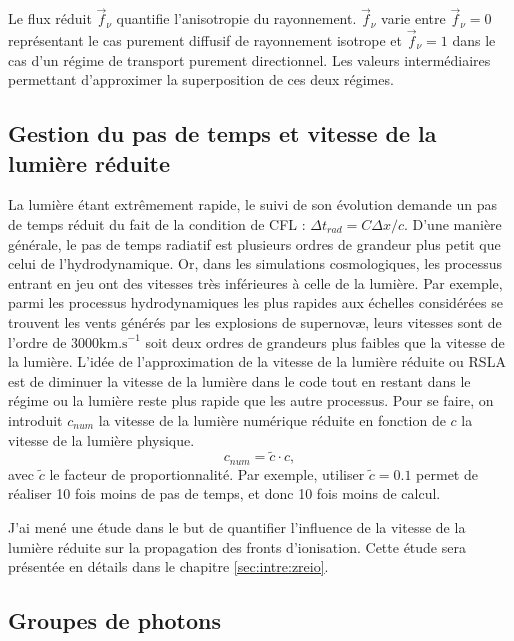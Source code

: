 Le flux réduit $\vec{f}_\nu$ quantifie l'anisotropie du rayonnement.
$\vec{f}_\nu$ varie entre $\vec{f}_\nu=0$ représentant le cas purement diffusif de rayonnement isotrope et $\vec{f}_\nu=1$ dans le cas d'un régime de transport purement directionnel.
Les valeurs intermédiaires permettant d'approximer la superposition de ces deux régimes.

\subsection{Gestion du pas de temps et vitesse de la lumière réduite}
\label{sec:RSLA}

La lumière étant extrêmement rapide, le suivi de son évolution demande un pas de temps réduit du fait de la condition de \ac{CFL} : $\Delta t_{rad} = C  \Delta x /c$.
D'une manière générale, le pas de temps radiatif est plusieurs ordres de grandeur plus petit que celui de l'hydrodynamique.
Or, dans les simulations cosmologiques, les processus entrant en jeu ont des vitesses très inférieures à celle de la lumière.
Par exemple, parmi les processus hydrodynamiques les plus rapides aux échelles considérées se trouvent les vents générés par les explosions de supernovæ, leurs vitesses sont de l'ordre de $3000 \mathrm{km.s}^{-1}$ soit deux ordres de grandeurs plus faibles que la vitesse de la lumière.
L'idée de l'approximation de la vitesse de la lumière réduite ou \ac{RSLA} est de diminuer la vitesse de la lumière dans le code tout en restant dans le régime ou la lumière reste plus rapide que les autre processus.
Pour se faire, on introduit $c_{num}$ la vitesse de la lumière numérique réduite en fonction de $c$ la vitesse de la lumière physique.
\begin{equation}
c_{num} = \tilde{c} \cdot{c},
\end{equation}
avec $\tilde{c}$ le facteur de proportionnalité. 
Par exemple, utiliser $\tilde{c}=0.1$ permet de réaliser 10 fois moins de pas de temps, et donc 10 fois moins de calcul.

J'ai mené une étude dans le but de quantifier l'influence de la vitesse de la lumière réduite sur la propagation des fronts d'ionisation.
Cette étude sera présentée en détails dans le chapitre \ref{sec:intre:zreio}.


\subsection{Groupes de photons}
\label{sec:groupedephotons}

